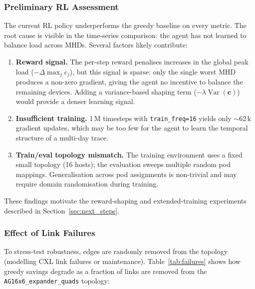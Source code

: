 \documentclass[11pt]{article}
\begin{document}
\subsubsection*{Preliminary RL Assessment}

The current RL policy underperforms the greedy baseline on every metric.
The root cause is visible in the time-series comparison: the agent has not
learned to balance load across MHDs.  Several factors likely contribute:

\begin{enumerate}
    \item \textbf{Reward signal.}  The per-step reward penalises increases
          in the global peak load ($-\Delta \max_j c_j$), but this signal
          is sparse: only the single worst MHD produces a non-zero gradient,
          giving the agent no incentive to balance the remaining devices.
          Adding a variance-based shaping term
          ($-\lambda \operatorname{Var}(\mathbf{c})$) would provide a
          denser learning signal.

    \item \textbf{Insufficient training.}  1\,M timesteps with
          \texttt{train\_freq=16} yields only $\sim$62\,k gradient updates,
          which may be too few for the agent to learn the temporal structure
          of a multi-day trace.

    \item \textbf{Train/eval topology mismatch.}  The training environment
          uses a fixed small topology (16 hosts); the evaluation sweeps
          multiple random pod mappings.  Generalisation across pod
          assignments is non-trivial and may require domain randomisation
          during training.
\end{enumerate}

These findings motivate the reward-shaping and extended-training experiments
described in Section~\ref{sec:next_steps}.

\subsubsection*{Effect of Link Failures}

To stress-test robustness, edges are randomly removed from the topology
(modelling CXL link failures or maintenance).  Table~\ref{tab:failures} shows
how greedy savings degrade as a fraction of links are removed from the
\texttt{AG16x6\_expander\_quads} topology:
\end{document}
